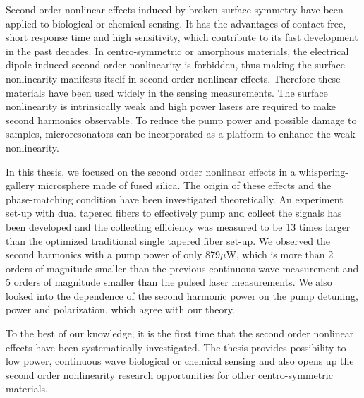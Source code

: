 \begin{eabstract}
Second order nonlinear effects induced by broken surface symmetry  have  been applied to biological or chemical sensing. It has the advantages of contact-free, short response time and high sensitivity, which contribute to its fast development in the past decades. In centro-symmetric or amorphous materials, the electrical dipole induced second order nonlinearity is forbidden, thus making the surface nonlinearity manifests itself in second order nonlinear effects. Therefore these materials have been used widely in the sensing measurements. The surface nonlinearity is intrinsically weak and high power lasers are required to make second harmonics observable. To reduce the pump power and possible damage to samples, microresonators can be incorporated as a platform to enhance the weak nonlinearity.

In this thesis, we focused on the second order nonlinear effects in a whispering-gallery microsphere made of fused silica. The origin of these effects and the phase-matching condition have been investigated theoretically. An experiment set-up with dual tapered fibers to effectively pump and collect the signals has been developed and the collecting efficiency was measured to be 13 times larger than the optimized traditional single tapered fiber set-up. We observed the second harmonics with a pump power of only 879$\mu$W, which is more than 2 orders of magnitude smaller than the previous continuous wave measurement and 5 orders of magnitude smaller than the pulsed laser measurements. We also looked into the dependence of the second harmonic power on the pump detuning, power and polarization, which agree with our theory.

To the best of our knowledge, it is the first time that the second order nonlinear effects have been systematically investigated. The thesis provides possibility to low power, continuous wave biological or chemical sensing and also opens up the second order nonlinearity research opportunities for other centro-symmetric materials.
\end{eabstract}

